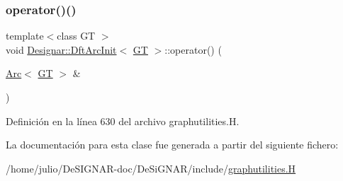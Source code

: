 \subsubsection{\texorpdfstring{operator()()}{operator()()}}
{\footnotesize\ttfamily template$<$class GT $>$ \\
void \hyperlink{class_designar_1_1_dft_arc_init}{Designar\+::\+Dft\+Arc\+Init}$<$ \hyperlink{demo-buildgraph_8_c_a3001c40d2c31ca87ed96cd7d1334a55e}{GT} $>$\+::operator() (\begin{DoxyParamCaption}\item[{\hyperlink{namespace_designar_a3f55fb5513d62ff47cbc8f72b8e95d6f}{Arc}$<$ \hyperlink{demo-buildgraph_8_c_a3001c40d2c31ca87ed96cd7d1334a55e}{GT} $>$ \&}]{ }\end{DoxyParamCaption})\hspace{0.3cm}{\ttfamily [inline]}}



Definición en la línea 630 del archivo graphutilities.\+H.



La documentación para esta clase fue generada a partir del siguiente fichero\+:\begin{DoxyCompactItemize}
\item 
/home/julio/\+De\+S\+I\+G\+N\+A\+R-\/doc/\+De\+Si\+G\+N\+A\+R/include/\hyperlink{graphutilities_8_h}{graphutilities.\+H}\end{DoxyCompactItemize}
